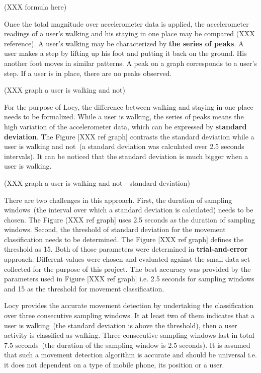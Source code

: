(XXX formula here)

Once the total magnitude over accelerometer data is applied, the accelerometer readings of a user's walking and his staying in one place may be compared (XXX reference). A user's walking may be characterized by \textbf{the series of peaks}. A user makes a step by lifting up his foot and putting it back on the ground. His another foot moves in similar patterns. A peak on a graph corresponds to a user's step. If a user is in place, there are no peaks observed. 

(XXX graph a user is walking and not)

For the purpose of Locy, the difference between walking and staying in one place needs to be formalized. While a user is walking, the series of peaks means the high variation of the accelerometer data, which can be expressed by \textbf{standard deviation}. The Figure [XXX ref graph] contrasts the standard deviation while a user is walking and not\ (a standard deviation was calculated over 2.5 seconds intervals). It can be noticed that the standard deviation is much bigger when a user is walking.

(XXX graph a user is walking and not  - standard deviation)

There are two challenges in this approach. First, the duration of sampling windows\ (the interval over which a standard deviation is calculated) needs to be chosen. The Figure (XXX ref graph] uses 2.5 seconds as the duration of sampling windows. Second, the threshold of standard deviation for the movement classification needs to be determined.  The Figure [XXX ref graph] defines the threshold as 15. Both of those parameters were determined in \textbf{trial-and-error} approach. Different values were chosen and evaluated against the small data set collected for the purpose of this project. The best accuracy was provided by the parameters used in Figure [XXX ref graph] i.e. 2.5 seconds for sampling windows and 15 as the threshold for movement classification. 

Locy provides the accurate movement detection by undertaking the classification over three consecutive sampling windows. It at least two of them indicates that a user is walking\ (the standard deviation is above the threshold), then a user activity is classified as walking. Three consecutive sampling windows last in total 7.5 seconds\ (the duration of the sampling window is 2.5 seconds). It is assumed that such a movement detection algorithm is accurate and should be universal i.e. it does not dependent on a type of mobile phone, its position or a user.

